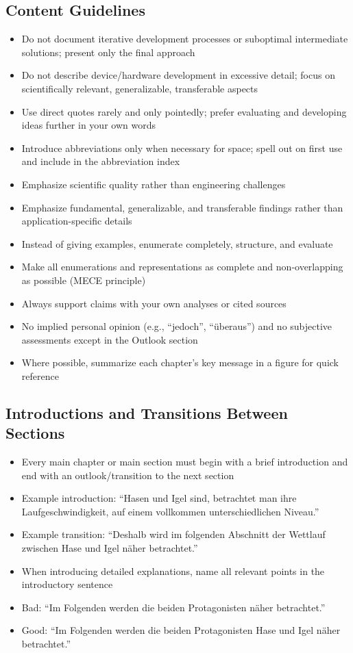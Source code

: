 \subsection{Content Guidelines}
\begin{itemize}
    \item Do not document iterative development processes or suboptimal intermediate solutions; present only the final approach
    \item Do not describe device/hardware development in excessive detail; focus on scientifically relevant, generalizable, transferable aspects
    \item Use direct quotes rarely and only pointedly; prefer evaluating and developing ideas further in your own words
    \item Introduce abbreviations only when necessary for space; spell out on first use and include in the abbreviation index
    \item Emphasize scientific quality rather than engineering challenges
    \item Emphasize fundamental, generalizable, and transferable findings rather than application-specific details
    \item Instead of giving examples, enumerate completely, structure, and evaluate
    \item Make all enumerations and representations as complete and non-overlapping as possible (MECE principle)
    \item Always support claims with your own analyses or cited sources
    \item No implied personal opinion (e.g., ``jedoch'', ``\"uberaus'') and no subjective assessments except in the Outlook section
    \item Where possible, summarize each chapter's key message in a figure for quick reference
\end{itemize}

\subsection{Introductions and Transitions Between Sections}
\begin{itemize}
    \item Every main chapter or main section must begin with a brief introduction and end with an outlook/transition to the next section
    \item Example introduction: ``Hasen und Igel sind, betrachtet man ihre Laufgeschwindigkeit, auf einem vollkommen unterschiedlichen Niveau.''
    \item Example transition: ``Deshalb wird im folgenden Abschnitt der Wettlauf zwischen Hase und Igel n\"aher betrachtet.''
    \item When introducing detailed explanations, name all relevant points in the introductory sentence
    \item Bad: ``Im Folgenden werden die beiden Protagonisten n\"aher betrachtet.''
    \item Good: ``Im Folgenden werden die beiden Protagonisten Hase und Igel n\"aher betrachtet.''
\end{itemize}

